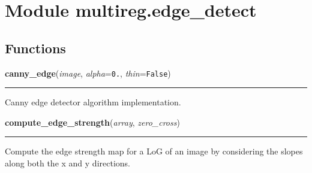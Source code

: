 %
%
%


\section{Module multireg.edge\_detect}

    \label{multireg:edge_detect}


  \subsection{Functions}

    \label{multireg:edge_detect:canny_edge}
    \vspace{0.5ex}

    \begin{boxedminipage}{\textwidth}

    \raggedright \textbf{canny\_edge}(\textit{image}, \textit{alpha}=\texttt{0\-.\-}, \textit{thin}=\texttt{F\-a\-l\-s\-e\-})

    \vspace{-1.5ex}

    \rule{\textwidth}{0.5\fboxrule}
    Canny edge detector algorithm implementation.

    \vspace{1ex}

    \end{boxedminipage}

    \label{multireg:edge_detect:compute_edge_strength}
    \vspace{0.5ex}

    \begin{boxedminipage}{\textwidth}

    \raggedright \textbf{compute\_edge\_strength}(\textit{array}, \textit{zero\_cross})

    \vspace{-1.5ex}

    \rule{\textwidth}{0.5\fboxrule}
    Compute the edge strength map for a LoG of an image by considering 
    the slopes along both the x and y directions.

    \vspace{1ex}

    \end{boxedminipage}

